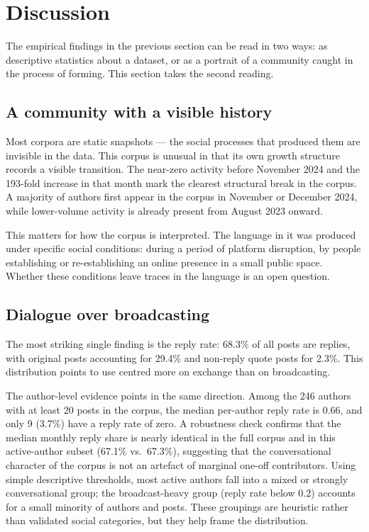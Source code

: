 \section{Discussion}

The empirical findings in the previous section can be read in two ways: as descriptive statistics about a dataset, or as a portrait of a community caught in the process of forming. This section takes the second reading.

\subsection{A community with a visible history}

Most corpora are static snapshots --- the social processes that produced them are invisible in the data. This corpus is unusual in that its own growth structure records a visible transition. The near-zero activity before November 2024 and the 193-fold increase in that month mark the clearest structural break in the corpus. A majority of authors first appear in the corpus in November or December 2024, while lower-volume activity is already present from August 2023 onward.

This matters for how the corpus is interpreted. The language in it was produced under specific social conditions: during a period of platform disruption, by people establishing or re-establishing an online presence in a small public space. Whether these conditions leave traces in the language is an open question.

\subsection{Dialogue over broadcasting}

The most striking single finding is the reply rate: 68.3\% of all posts are replies, with original posts accounting for 29.4\% and non-reply quote posts for 2.3\%. This distribution points to use centred more on exchange than on broadcasting.

The author-level evidence points in the same direction. Among the 246 authors with at least 20 posts in the corpus, the median per-author reply rate is 0.66, and only 9 (3.7\%) have a reply rate of zero. A robustness check confirms that the median monthly reply share is nearly identical in the full corpus and in this active-author subset (67.1\% vs.\ 67.3\%), suggesting that the conversational character of the corpus is not an artefact of marginal one-off contributors. Using simple descriptive thresholds, most active authors fall into a mixed or strongly conversational group; the broadcast-heavy group (reply rate below 0.2) accounts for a small minority of authors and posts. These groupings are heuristic rather than validated social categories, but they help frame the distribution.

